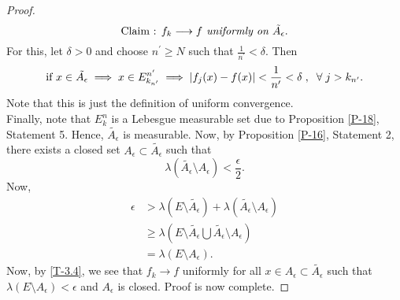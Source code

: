 \documentclass{article}
\theoremstyle{definition}
\theoremstyle{remark}
\theoremstyle{definition}
\theoremstyle{definition}
\theoremstyle{definition}
\DeclarePairedDelimiter\abs{\lvert}{\rvert}
\newcommand{\bunion}{\bigcup}
\newcommand{\lm}[1]{\lambda\left (#1\right )}
\begin{document}
\begin{proof}
\[\text{Claim : \textit{$ f_k \longrightarrow f $ uniformly on $ \tilde{A_\epsilon} $}.}\]
For this, let $ \delta > 0 $ and choose $ n^{\prime}\ge N $ such that $ \frac{1}{n^{\prime}} < \delta $. Then
\begin{equation}\label{T-3.4}
	\text{if } x\in \tilde{A_{\epsilon}} \implies x\in E_{k_{n^{\prime}}}^{n^{\prime}} \implies \abs{f_j(x) - f(x)} < \frac{1}{n^{\prime}} <\delta\;,\;\;\forall\;j > k_{n^{\prime}}.
\end{equation}
Note that this is just the definition of uniform convergence. \\
Finally, note that $ E_k^{n} $ is a Lebesgue measurable set due to Proposition \ref{P-18}, Statement 5. Hence, $ \tilde{A_\epsilon} $ is measurable. Now, by Proposition \ref{P-16}, Statement 2, there exists a closed set $ A_\epsilon \subset \tilde{A_\epsilon} $ such that \[\lm{\tilde{A_\epsilon} \setminus A_\epsilon} < \frac{\epsilon}{2}.\]
Now,
\begin{equation*}
	\begin{split}
	\epsilon &>	\lm{E\setminus \tilde{A_\epsilon} } + \lm{\tilde{A_\epsilon}\setminus A_\epsilon}\\
	&\ge \lm{E\setminus \tilde{A_\epsilon} \bunion \tilde{A_\epsilon}\setminus A_\epsilon}\\
	&= \lm{E\setminus A_\epsilon}.
	\end{split}
\end{equation*}
Now, by \eqref{T-3.4}, we see that $ f_k \longrightarrow f $ uniformly for all $ x\in A_\epsilon \subset \tilde{A_\epsilon} $ such that $ \lm{E\setminus A_\epsilon}< \epsilon $ and $ A_\epsilon $ is closed. Proof is now complete.
\end{proof}
\hrulefill
\end{document}
